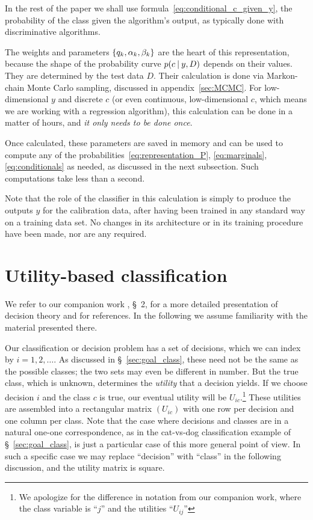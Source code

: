 \documentclass[\ifafour a4paper,12pt,\else a5paper,10pt,\fi%
onecolumn,oneside,article,%
british%
]{memoir}
\theoremstyle{remark}
\theoremstyle{innote}
\DeclarePairedDelimiter\set{\{}{\}} %
\renewcommand*{\|}[1][]{\nonscript\:#1\vert\nonscript\:\mathopen{}}
\newcommand*{\sect}{\S}%
\begin{document}
In the rest of the paper we shall use formula~\eqref{eq:conditional_c_given_y}, the probability of the class given the algorithm's output, as typically done with discriminative algorithms. 

\medskip

The weights and parameters $\set{q_{k}, \alpha_{k}, \beta_{k}}$ are the heart of this representation, because the shape of the probability curve $p(c \| y, D)$ depends on their values. They are determined by the test data $D$. Their calculation is done via Markon-chain Monte Carlo sampling, discussed in appendix~\ref{sec:MCMC}. For low-dimensional $y$ and discrete $c$ (or even continuous, low-dimensional $c$, which means we are working with a regression algorithm), this calculation can be done in a matter of hours, and \emph{it only needs to be done once}.

Once calculated, these parameters are saved in memory and can be used to compute any of the probabilities~\eqref{eq:representation_P}, \eqref{eq:marginals}, \eqref{eq:conditionals} as needed, as discussed in the next subsection. Such computations take less than a second.

Note that the role of the classifier in this calculation is simply to produce the outputs $y$ for the calibration data, after having been trained in any standard way on a training data set. No changes in its architecture or in its training procedure have been made, nor are any required.



\section{Utility-based classification}
\label{sec:utility_classification}

We refer to our companion work \cite{dyrlandetal2022}, \sect~2, for a more detailed presentation of decision theory and for references. In the following we assume familiarity with the material presented there.

Our classification or decision problem has a set of decisions, which we can index by $i = 1,2,\dotsc$. As discussed in \sect~\ref{sec:goal_class}, these need not be the same as the possible classes; the two sets may even be different in number. But the true class, which is unknown, determines the \emph{utility} that a decision yields. If we choose decision $i$ and the class $c$ is true, our eventual utility will be $U_{ic}$.\footnote{We apologize for the difference in notation from our companion work, where the class variable is \enquote{$j$} and the utilities \enquote{$U_{ij}$}} These utilities are assembled into a rectangular matrix $(U_{ic})$ with one row per decision and one column per class. Note that the case where decisions and classes are in a natural one-one correspondence, as in the cat-vs-dog classification example of \sect~\ref{sec:goal_class}, is just a particular case of this more general point of view. In such a specific case we may replace \enquote{decision} with \enquote{class} in the following discussion, and the utility matrix is square.
\end{document}

